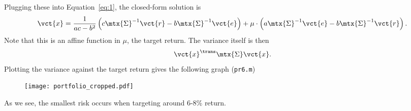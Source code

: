 \documentclass{article}
\begin{document}
Plugging these into Equation~\eqref{eq:1}, the closed-form solution is
\begin{equation*}
 \vct{x} = \frac{1}{ac-b^2} \left(c\mtx{\Sigma}^{-1}\vct{r}-b\mtx{\Sigma}^{-1}\vct{e}\right)+\mu\cdot \left(a\mtx{\Sigma}^{-1}\vct{e}-b\mtx{\Sigma}^{-1}\vct{r}\right).
\end{equation*}
Note that this is an affine function in $\mu$, the target return. The variance itself is then
\begin{equation*}
 \vct{x}^{\trans}\mtx{\Sigma}\vct{x}.
\end{equation*}
Plotting the variance against the target return gives the following graph ({\tt pr6.m})
\begin{figure}[h!]
 \centering
 \texttt{[image: portfolio\_cropped.pdf]}
\end{figure}
As we see, the smallest risk occurs when targeting around 6-8\% return.
\end{document}

